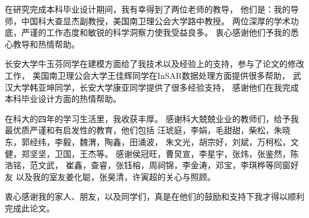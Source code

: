 
\begin{acknowledgements}

在研究完成本科毕业设计期间，我有幸得到了两位老师的教导，
他们是：我的导师，中国科大查显杰副教授，美国南卫理公会大学路中教授。
两位深厚的学术功底，严谨的工作态度和敏锐的科学洞察力使我受益良多。
衷心感谢他们予我的悉心教导和热情帮助。

长安大学牛玉芬同学在建模方面给了我技术以及经验上的支持，参与了论文的修改工作，
美国南卫理公会大学王佳辉同学在InSAR数据处理方面提供很多帮助，
武汉大学韩亚坤同学，长安大学康亚同学提供了很多经验支持，
感谢他们在我完成本科毕业设计方面的热情帮助。

在科大的四年的学习生活里，我收获丰厚。
感谢科大兢兢业业的教师们，给予我最优质严谨和有启发性的教育，他们包括
汪琥庭，李娟，毛甜甜，柴松，朱晓东，郭经纬，李毅，魏渭，陶鑫，田涌波，
朱文光，胡宗好，刘斌，万柯松，文健，郑坚坚，卫国，王杰等。
感谢侯冠旺，曹炅宣，李星宇，张炜，张鉴然，陈浩铭，范文武，
崔鑫，查睿，张钰榕，周祠锦，李金涛，邓宝，李琪桦等同窗好友
以及我的室友姜化聪，张昊清，许寅超的关心与照顾。

衷心感谢我的家人、朋友，以及同学们，真是在他们的鼓励和支持下我才得以顺利完成此论文。

\end{acknowledgements}
